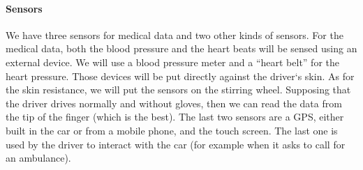 \documentclass[a4paper]{article}
\begin{document}
\paragraph{Sensors} We have three sensors for medical data and two other kinds of sensors. For the medical data, both the blood pressure and the heart beats will be sensed using an external device. We will use a blood pressure meter and a “heart belt” for the heart pressure. Those devices will be put directly against the driver`s skin. As for the skin resistance, we will put the sensors on the stirring wheel. Supposing that the driver drives normally and without gloves, then we can read the data from the tip of the finger (which is the best). The last two sensors are a GPS, either built in the car or from a mobile phone, and the touch screen. The last one is used by the driver to interact with the car (for example when it asks to call for an ambulance).
\end{document}
